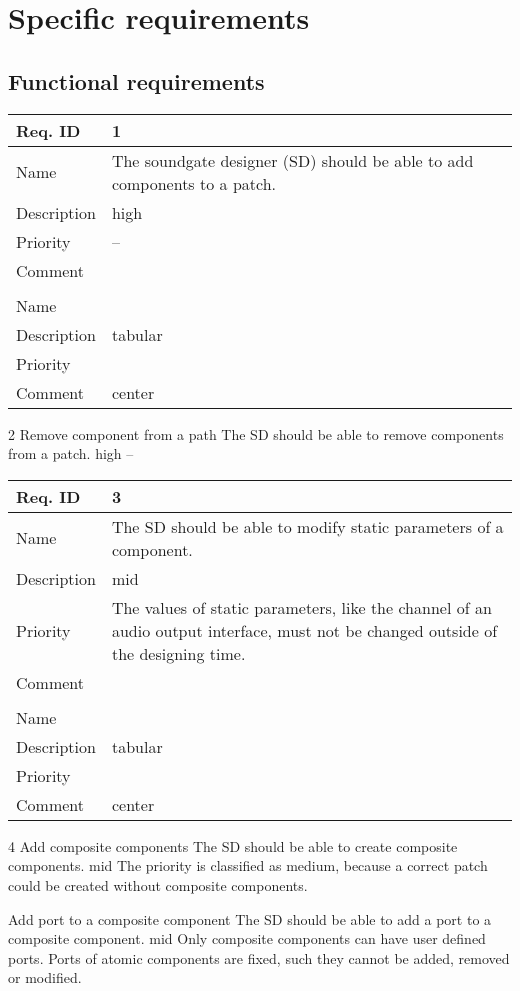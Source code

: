 \chapter{Specific requirements}

\newcommand{\funcRequirement}[6]{
\begin{center}
\begin{tabular}{|l|p{12cm}|}
\hline
Req. ID 		& #1 \\ \hline
Name 				& #3 \\ \hline
Description & #4 \\ \hline
Priority 		& #5 \\ \hline
Comment 		& #6 \\ \hline
\end{tabular}
\end{center}
}


	\section{Functional requirements}
	

	\funcRequirement{1}
	{Add component to a patch}
	{The soundgate designer (SD) should be able to add components to a patch.}
	{high}
	{--}
	
  \funcRequirement{2}
	{Remove component from a path}
	{The SD should be able to remove components from a patch.}
	{high}
	{--}
	
  \funcRequirement{3}
	{Modify attributes of a component}
	{The SD should be able to modify static parameters of a component.}
	{mid}
	{The values of static parameters, like the channel of an audio output interface, must not be changed outside of the designing time.}
	
	\funcRequirement{4}
	{Add composite components}
	{The SD should be able to create composite components.}
	{mid}
	{The priority is classified as medium, because a correct patch could be created without composite components. }
	
	{Add port to a composite component}
	{The SD should be able to add a port to a composite component.}
	{mid}
	{Only composite components can have user defined ports. Ports of atomic components are fixed, such they cannot be added, removed or modified.}
	
